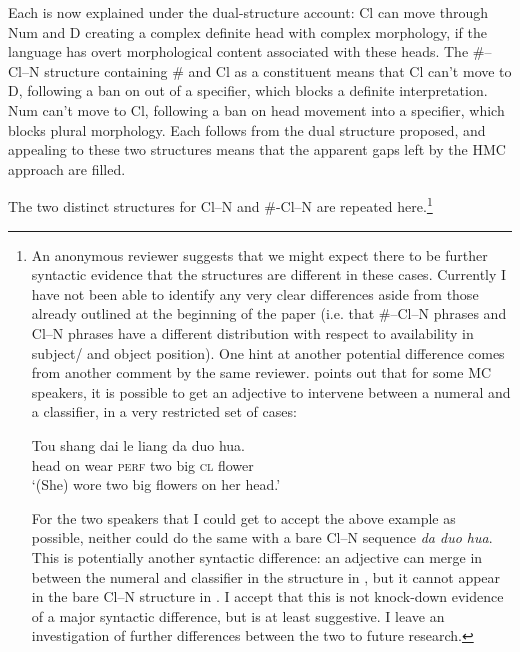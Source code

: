 \documentclass[output=paper
,modfonts
,nonflat]{langsci/langscibook}
\begin{document}
Each is now explained under the dual-structure account: Cl can move through Num and D creating a complex definite head with complex morphology, if the language has overt morphological content associated with these heads. The \#--Cl--N structure containing \# and Cl as a constituent means that Cl can't move to D, following a ban on  out of a specifier, which blocks a definite interpretation. Num can't move to Cl, following a ban on head movement into a specifier, which blocks plural morphology. Each follows from the dual structure proposed, and appealing to these two structures means that the apparent gaps left by the HMC approach are filled. 

The two distinct structures for Cl--N and \#-Cl--N are repeated here.\footnote{An anonymous reviewer suggests that we might expect there to be further syntactic evidence that the structures are different in these cases. Currently I have not been able to identify any very clear differences aside from those already outlined at the beginning of the paper (i.e. that \#--Cl--N phrases and Cl--N phrases have a different distribution with respect to availability in subject/ and object position). One hint at another potential difference comes from another comment by the same reviewer. \citet{Li2011} points out that for some MC speakers, it is possible to get an adjective to intervene between a numeral and a classifier, in a very restricted set of cases:
	
\begin{exe}
\gll
Tou shang dai le liang da duo hua.\\
head on wear \textsc{perf} two big \textsc{cl} flower\\
\glt
`(She) wore two big flowers on her head.'\\
\end{exe}

For the two speakers that I could get to accept the above example as possible, neither could do the same with a bare Cl--N sequence \textit{da duo hua}. This is potentially another syntactic difference: an adjective can merge in between the numeral and classifier in the structure in , but it cannot appear in the bare Cl--N structure in . I accept that this is not knock-down evidence of a major syntactic difference, but is at least suggestive. I leave an investigation of further differences between the two to future research.}
\end{document}

